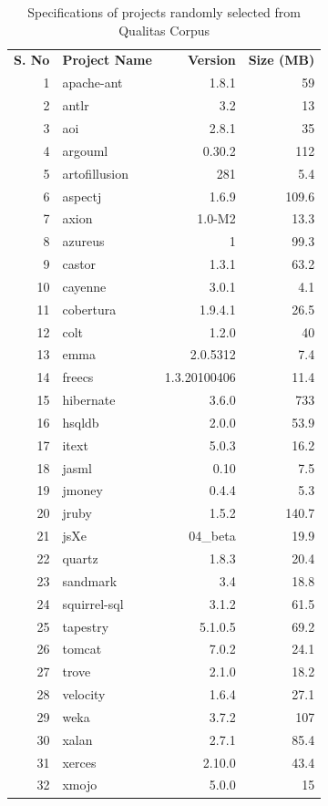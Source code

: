 \begin{table}[htp]
\caption{Specifications of projects randomly selected from Qualitas Corpus}
\bigskip
\centering
{\renewcommand{\arraystretch}{1.3} %
\begin{tabular}{|rlrr}

{\textbf {S. No}}& 	{\textbf {Project Name}}	& 	{\textbf {Version}}		&	{\textbf {Size (MB)}}\\
1	&	apache-ant	&	1.8.1			&	59\\
2	&	antlr		&	3.2				&	13\\
3	&	aoi			&	2.8.1			&	35\\
4	&	argouml		&	0.30.2			&	112\\
5	&	artofillusion	&	281				&	5.4\\
6	&	aspectj		&	1.6.9			&	109.6\\
7	&	axion		&	1.0-M2			&	13.3\\
8	&	azureus		&	1				&	99.3\\
9	&	castor		&	1.3.1			&	63.2\\
10	&	cayenne		&	3.0.1			&	4.1\\
11	&	cobertura	&	1.9.4.1			&	26.5\\
12	&	colt			&	1.2.0			&	40\\
13	&	emma		&	2.0.5312		&	7.4\\
14	&	freecs		&	1.3.20100406	&	11.4\\
15	&	hibernate	&	3.6.0			&	733\\
16	&	hsqldb		&	2.0.0			&	53.9\\
17	&	itext		&	5.0.3			&	16.2\\
18	&	jasml		&	0.10			&	7.5 \\
19	&	jmoney		&	0.4.4			&	5.3\\
20	&	jruby		&	1.5.2			&	140.7\\
21	&	jsXe			&	04\_beta		&	19.9\\
22	&	quartz		&	1.8.3			&	20.4\\
23	&	sandmark	&	3.4				&	18.8\\
24	&	squirrel-sql	&	3.1.2			&	61.5\\
25	&	tapestry		&	5.1.0.5			&	69.2\\
26	&	tomcat		&	7.0.2			&	24.1\\
27	&	trove		&	2.1.0			&	18.2\\
28	&	velocity		&	1.6.4			&	27.1\\
29	&	weka		&	3.7.2			&	107\\
30	&	xalan		&	2.7.1			&	85.4\\
31	&	xerces		&	2.10.0			&	43.4\\
32	&	xmojo		&	5.0.0			&	15\\
\hline
\end{tabular}
}
\bigskip
\label{table:projects}
\end{table}




